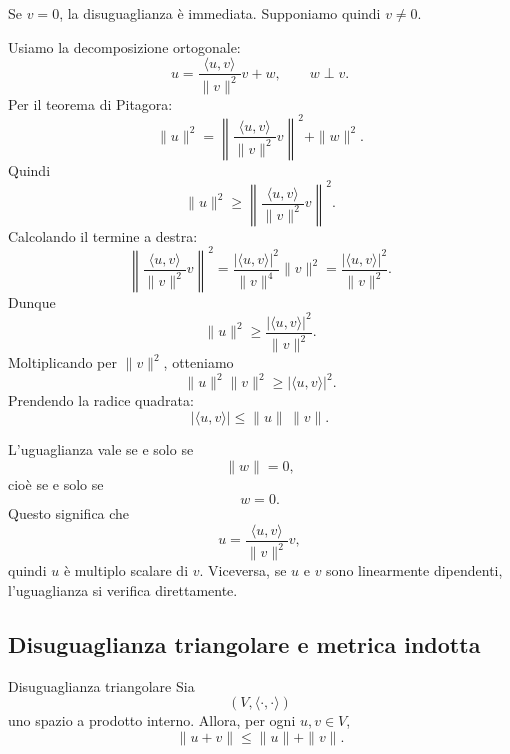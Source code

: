 \documentclass[a4paper]{article}
\begin{document}
\begin{snippetproof}{}
    Se \(v=0\), la disuguaglianza è immediata. Supponiamo quindi \(v\neq 0\).

    Usiamo la decomposizione ortogonale:
    \[
        u
        =
        \frac{\langle u,v\rangle}{\|v\|^2}v+w,
        \qquad
        w\perp v.
    \]
    Per il teorema di Pitagora:
    \[
        \|u\|^2
        =
        \left\|
        \frac{\langle u,v\rangle}{\|v\|^2}v
        \right\|^2
        +
        \|w\|^2.
    \]
    Quindi
    \[
        \|u\|^2
        \geq
        \left\|
        \frac{\langle u,v\rangle}{\|v\|^2}v
        \right\|^2.
    \]
    Calcolando il termine a destra:
    \[
        \left\|
        \frac{\langle u,v\rangle}{\|v\|^2}v
        \right\|^2
        =
        \frac{|\langle u,v\rangle|^2}{\|v\|^4}\|v\|^2
        =
        \frac{|\langle u,v\rangle|^2}{\|v\|^2}.
    \]
    Dunque
    \[
        \|u\|^2
        \geq
        \frac{|\langle u,v\rangle|^2}{\|v\|^2}.
    \]
    Moltiplicando per \(\|v\|^2\), otteniamo
    \[
        \|u\|^2\|v\|^2
        \geq
        |\langle u,v\rangle|^2.
    \]
    Prendendo la radice quadrata:
    \[
        |\langle u,v\rangle|
        \leq
        \|u\|\,\|v\|.
    \]

    L'uguaglianza vale se e solo se
    \[
        \|w\|=0,
    \]
    cioè se e solo se
    \[
        w=0.
    \]
    Questo significa che
    \[
        u=\frac{\langle u,v\rangle}{\|v\|^2}v,
    \]
    quindi \(u\) è multiplo scalare di \(v\). Viceversa, se \(u\) e \(v\) sono linearmente dipendenti, l'uguaglianza si verifica direttamente.
\end{snippetproof}

\subsection{Disuguaglianza triangolare e metrica indotta}

\begin{snippettheorem}{Disuguaglianza triangolare}
    Sia
    \[
        (V,\langle\cdot,\cdot\rangle)
    \]
    uno spazio a prodotto interno. Allora, per ogni \(u,v\in V\),
    \[
        \|u+v\|
        \leq
        \|u\|+\|v\|.
    \]
\end{snippettheorem}
\end{document}
